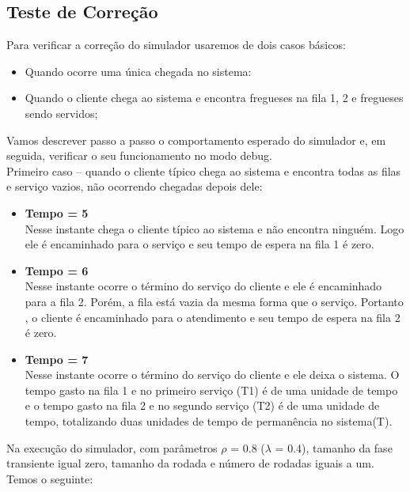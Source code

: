 \documentclass[a4paper,10pt]{article}
\begin{document}
      \subsection{Teste de Correção}
      Para verificar a correção do simulador usaremos de dois casos básicos:
      \begin{itemize}
	 \item Quando ocorre uma única chegada no sistema:
	 \item Quando o cliente chega ao sistema e encontra fregueses na fila 1, 2 e fregueses sendo servidos;
      \end{itemize}
      Vamos descrever passo a passo o comportamento esperado do simulador e, em seguida, verificar o seu funcionamento no modo debug. \\
      Primeiro caso – quando o cliente típico chega ao sistema e encontra todas as filas e serviço vazios, não ocorrendo chegadas depois dele:
      \begin{itemize}
	   \item \textbf{Tempo = 5\\}
	    Nesse instante chega o cliente típico ao sistema e não encontra ninguém. Logo ele é encaminhado para o serviço e seu tempo de espera na fila 1 é zero.
	  \item \textbf{Tempo = 6\\}
	    Nesse instante ocorre o término do serviço do cliente e ele é encaminhado para a fila 2. Porém, a fila está vazia da mesma forma que o serviço. Portanto
	    , o cliente é encaminhado para o atendimento e seu tempo de espera na fila 2 é zero.
	  \item \textbf{Tempo = 7\\}
	    Nesse instante ocorre o término do serviço do cliente e ele deixa o sistema. O tempo gasto na fila 1 e no primeiro serviço (T1) é de uma unidade de tempo e o 
	    tempo gasto na fila 2 e no segundo serviço (T2) é de uma unidade de tempo, totalizando duas unidades de tempo de permanência no sistema(T).
      \end{itemize}
      Na execução do simulador, com parâmetros $\rho$ = 0.8 ($\lambda$ = 0.4), tamanho da fase transiente igual zero, tamanho da rodada e número de rodadas iguais a um. Temos o seguinte:
\end{document}
